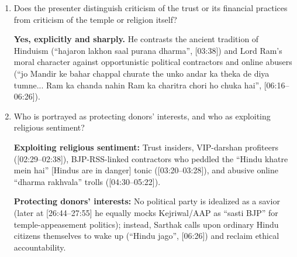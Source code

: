 \documentclass[10pt,a4paper]{article}
\begin{document}
\begin{enumerate}[leftmargin=1.5em, itemsep=6pt, topsep=4pt]
  \item Does the presenter distinguish criticism of the trust or its financial practices from criticism of the temple or religion itself?\par\smallskip
  \textbf{Yes, explicitly and sharply.} He contrasts the ancient tradition of Hinduism (``hajaron lakhon saal purana dharma'', [03:38]) and Lord Ram's moral character against opportunistic political contractors and online abusers (``jo Mandir ke bahar chappal churate the unko andar ka theka de diya tumne... Ram ka chanda nahin Ram ka charitra chori ho chuka hai'', [06:16--06:26]).
  \item Who is portrayed as protecting donors' interests, and who as exploiting religious sentiment?\par\smallskip
  \textbf{Exploiting religious sentiment:} Trust insiders, VIP-darshan profiteers ([02:29--02:38]), BJP-RSS-linked contractors who peddled the ``Hindu khatre mein hai'' [Hindus are in danger] tonic ([03:20--03:28]), and abusive online ``dharma rakhvala'' trolls ([04:30--05:22]).

  \textbf{Protecting donors' interests:} No political party is idealized as a savior (later at [26:44--27:55] he equally mocks Kejriwal/AAP as ``sasti BJP'' for temple-appeasement politics); instead, Sarthak calls upon ordinary Hindu citizens themselves to wake up (``Hindu jago'', [06:26]) and reclaim ethical accountability.
\end{enumerate}
\end{document}
